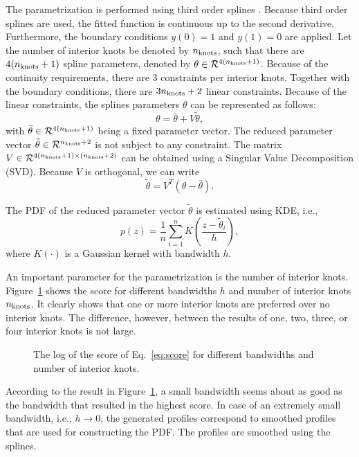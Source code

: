 \documentclass[10pt,final,a4paper,oneside,onecolumn]{article}
\newlength\figurewidth
\newlength\figureheight
\theoremstyle{plain}\newtheorem{definition}{Definition}[section]    %
\theoremstyle{definition}\newtheorem{example}{Example}[section]     %
\theoremstyle{remark}\newtheorem{remarkenv}{Remark}[section]        %
\newcommand{\nknots}{n_{\textup{knots}}}
\begin{document}
The parametrization is performed using third order splines \cite{dierckx1993splines}. Because third order splines are used, the fitted function is continuous up to the second derivative. Furthermore, the boundary conditions $y(0)=1$ and $y(1)=0$ are applied. Let the number of interior knots be denoted by $\nknots$, such that there are $4(\nknots+1)$ spline parameters, denoted by $\theta \in \mathcal{R}^{4(\nknots+1)}$. Because of the continuity requirements, there are $3$ constraints per interior knots. Together with the boundary conditions, there are $3\nknots+2$ linear constraints. Because of the linear constraints, the splines parameters $\theta$ can be represented as follows:
\begin{equation}
	\theta = \bar{\theta} + V \tilde{\theta},
\end{equation}
with $\bar{\theta} \in \mathcal{R}^{4(\nknots+1)}$ being a fixed parameter vector. The reduced parameter vector $\tilde{\theta} \in \mathcal{R}^{\nknots+2}$ is not subject to any constraint. The matrix $V \in \mathcal{R}^{4(\nknots+1) \times (\nknots+2)}$ can be obtained using a Singular Value Decomposition (SVD). Because $V$ is orthogonal, we can write
\begin{equation}
	\tilde{\theta} = V^T \left( \theta - \bar{\theta} \right).
\end{equation}

The PDF of the reduced parameter vector $\tilde{\theta}$ is estimated using KDE, i.e.,
\begin{equation}
	p(z) = \frac{1}{n} \sum_{i=1}^{n} K \left( \frac{ z - \tilde{\theta}_i }{h} \right),
\end{equation}
where $K(\cdot)$ is a Gaussian kernel with bandwidth $h$.

An important parameter for the parametrization is the number of interior knots. Figure~\ref{fig:number of knots} shows the score for different bandwidths $h$ and number of interior knots $\nknots$. It clearly shows that one or more interior knots are preferred over no interior knots. The difference, however, between the results of one, two, three, or four interior knots is not large. 

\begin{figure}
	\centering
	\setlength\figureheight{200pt}
	\setlength\figurewidth{300pt}
	
	\caption{The log of the score of Eq.~\eqref{eq:score} for different bandwidths and number of interior knots.}
	\label{fig:number of knots}
\end{figure}

According to the result in Figure~\ref{fig:number of knots}, a small bandwidth seems about as good as the bandwidth that resulted in the highest score. In case of an extremely small bandwidth, i.e., $h \rightarrow 0$, the generated profiles correspond to smoothed profiles that are used for constructing the PDF. The profiles are smoothed using the splines. 



\end{document}
